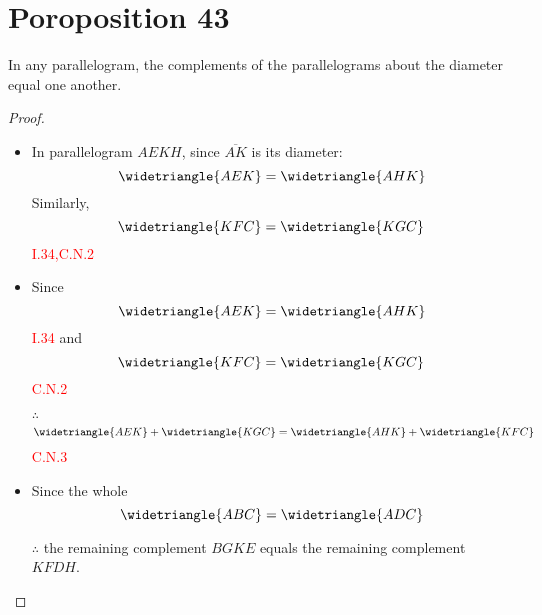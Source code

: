
\section*{Poroposition 43}

\begin{thm}
In any parallelogram, the complements of the parallelograms about the diameter equal one another.
\end{thm}

\begin{proof}

\begin{itemize}

\item[]

\begin{figure}[H]
	\caption{}
\end{figure}

\item In parallelogram $AEKH$, since $\overline{AK}$ is its diameter:
\[\widetriangle{AEK} = \widetriangle{AHK}\] 
Similarly,  
\[\widetriangle{KFC} = \widetriangle{KGC}\]\hfill\textcolor{red}{I.34,C.N.2}

\begin{figure}[H]
	\caption{}
\end{figure}

\item Since 
\[\widetriangle{AEK} = \widetriangle{AHK}\] \hfill\textcolor{red}{I.34}
and 
\[\widetriangle{KFC} = \widetriangle{KGC}\] \hfill\textcolor{red}{C.N.2}

\item[$\therefore$] 
\[\widetriangle{AEK} + \widetriangle{KGC} =  \widetriangle{AHK} + \widetriangle{KFC}\]\hfill\textcolor{red}{C.N.3}

\item Since the whole 
\[\widetriangle{ABC} = \widetriangle{ADC}\]

\item[$\therefore$]the remaining complement $BGKE$ equals the remaining complement $KFDH$.

\end{itemize}

\end{proof}

\clearpage
